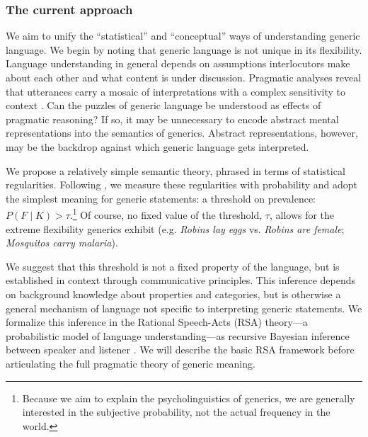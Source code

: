 \documentclass[12pt,letterpaper]{article}
\begin{document}

\subsubsection*{The current approach}

We aim to unify the ``statistical'' and ``conceptual'' ways of understanding generic language. 
We begin by noting that generic language is not unique in its flexibility.
Language understanding in general depends on assumptions interlocutors make about each other and what content is under discussion. 
Pragmatic analyses reveal that utterances carry a mosaic of interpretations with a complex sensitivity to context \cite{Clark1996,Grice1975,Levinson2000}. 
Can the puzzles of generic language be understood as effects of pragmatic reasoning?
If so, it may be unnecessary to encode abstract mental representations%
into the semantics of generics.
Abstract representations, however, may be the backdrop against which generic language gets interpreted. 

We propose a relatively simple semantic theory, phrased in terms of statistical regularities.
Following , we measure these regularities with probability and adopt the simplest meaning for generic statements: a threshold on prevalence: $P(F\mid K)>\tau$.\footnote{Because we aim to explain the psycholinguistics of generics, we are generally interested in the subjective probability, not the actual frequency in the world.}
Of course, no fixed value of the threshold, $\tau$, allows for the extreme flexibility generics exhibit (e.g. \emph{Robins lay eggs} vs. \emph{Robins are female}; \emph{Mosquitos carry malaria}).%

We suggest that this threshold is not a fixed property of the language, but is established in context through communicative principles.
This inference depends on background knowledge about properties and categories, but is otherwise a general mechanism of language not specific to interpreting generic statements.
We formalize this inference in the Rational Speech-Acts (RSA) theory---a probabilistic model of language understanding---as recursive Bayesian inference between speaker and listener \cite{Frank2012,Goodman2013}.
We will describe the basic RSA framework before articulating the full pragmatic theory of generic meaning.
\end{document}
